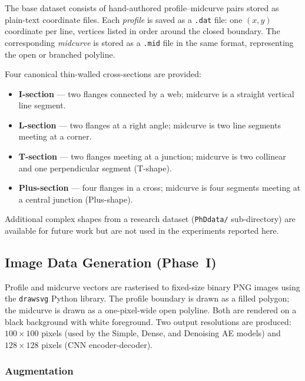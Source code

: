 \documentclass[journal]{IEEEtran}
\begin{document}
The base dataset consists of hand-authored profile--midcurve pairs stored as
plain-text coordinate files.  Each \emph{profile} is saved as a \texttt{.dat}
file: one $(x, y)$ coordinate per line, vertices listed in order around the
closed boundary.  The corresponding \emph{midcurve} is stored as a
\texttt{.mid} file in the same format, representing the open or branched
polyline.

Four canonical thin-walled cross-sections are provided:
\begin{itemize}
  \item \textbf{I-section} — two flanges connected by a web; midcurve is a
        straight vertical line segment.
  \item \textbf{L-section} — two flanges at a right angle; midcurve is two
        line segments meeting at a corner.
  \item \textbf{T-section} — two flanges meeting at a junction; midcurve is
        two collinear and one perpendicular segment (T-shape).
  \item \textbf{Plus-section} — four flanges in a cross; midcurve is four
        segments meeting at a central junction (Plus-shape).
\end{itemize}
Additional complex shapes from a research dataset (\texttt{PhDdata/}
sub-directory) are available for future work but are not used in the
experiments reported here.

\subsection{Image Data Generation (Phase~I)}

Profile and midcurve vectors are rasterised to fixed-size binary PNG images
using the \texttt{drawsvg} Python library.  The profile boundary is drawn as a
filled polygon; the midcurve is drawn as a one-pixel-wide open polyline.  Both
are rendered on a black background with white foreground.  Two output
resolutions are produced: $100 \times 100$ pixels (used by the Simple, Dense,
and Denoising AE models) and $128 \times 128$ pixels (CNN encoder-decoder).

\subsubsection{Augmentation}
\end{document}
